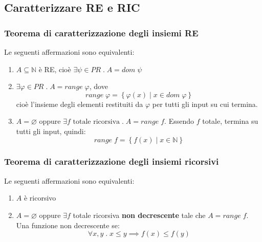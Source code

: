 \documentclass[a4paper]{article}
\begin{document}
\subsection{Caratterizzare RE e RIC}
\subsubsection{Teorema di caratterizzazione degli insiemi RE}
\begin{theorem}
  Le seguenti affermazioni sono equivalenti:
  \begin{enumerate}
    \item \( A \subseteq \mathbb{N} \) è RE, cioè
      \( \exists \psi \in PR \;.\; A = dom\; \psi \) 

    \item \( \exists \varphi \in PR \;.\; A = range\; \varphi \), dove
      \[
        range\; \varphi = \left\{ \left. \varphi(x) \;\right|\; x \in dom\; \varphi \right\}
      \]
      cioè l'insieme degli elementi restituiti da \( \varphi \) per tutti gli input su cui
      termina.

    \item \( A = \varnothing \) oppure \( \exists f \text{ totale ricorsiva} \;.\; A = range\; f \).
      Essendo \( f \) totale, termina su tutti gli input, quindi:
      \[
        range\; f = \left\{ \left. f(x) \;\right|\; x \in \mathbb{N} \right\}
      \] 
  \end{enumerate}
\end{theorem}

\subsubsection{Teorema di caratterizzazione degli insiemi ricorsivi}
\begin{theorem}
  Le seguenti affermazioni sono equivalenti:
  \begin{enumerate}
    \item \( A \) è ricorsivo

    \item \( A = \varnothing \) oppure \( \exists f \) totale ricorsiva \textbf{non decrescente}
      tale che \( A = range\; f \). Una funzione non decrescente se:
      \[
        \forall x, y \;.\; x \le y \implies f(x) \le f(y)
      \] 
  \end{enumerate}
\end{theorem}
\end{document}
